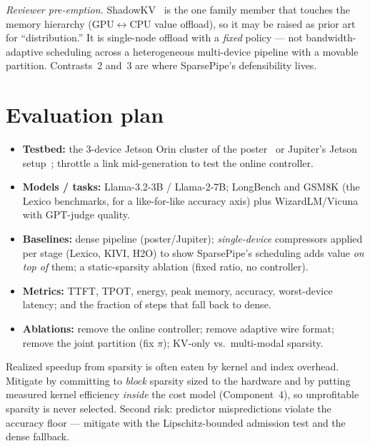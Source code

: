 \documentclass[11pt]{article}
\newcommand{\term}[1]{\textbf{\color{accent!85!black}#1}}
\begin{document}
\noindent\emph{Reviewer pre-emption.} ShadowKV~\cite{shadowkv} is the one family member that
touches the memory hierarchy (GPU$\leftrightarrow$CPU value offload), so it may be raised as
prior art for ``distribution.'' It is single-node offload with a \emph{fixed} policy --- not
bandwidth-adaptive scheduling across a heterogeneous multi-device pipeline with a movable
partition. Contrasts~2 and~3 are where SparsePipe's defensibility lives.

\section{Evaluation plan}

\begin{itemize}[leftmargin=1.5em,itemsep=2pt]
\item \term{Testbed:} the 3-device Jetson Orin cluster of the poster~\cite{poster} or
Jupiter's Jetson setup~\cite{jupiter}; throttle a link mid-generation to test the online
controller.
\item \term{Models / tasks:} Llama-3.2-3B / Llama-2-7B; LongBench and GSM8K (the Lexico
benchmarks, for a like-for-like accuracy axis) plus WizardLM/Vicuna with GPT-judge quality.
\item \term{Baselines:} dense pipeline (poster/Jupiter); \emph{single-device} compressors
applied per stage (Lexico, KIVI, H2O) to show SparsePipe's scheduling adds value \emph{on top
of} them; a static-sparsity ablation (fixed ratio, no controller).
\item \term{Metrics:} TTFT, TPOT, energy, peak memory, accuracy, worst-device latency; and
the fraction of steps that fall back to dense.
\item \term{Ablations:} remove the online controller; remove adaptive wire format; remove the
joint partition (fix $\pi$); KV-only vs.\ multi-modal sparsity.
\end{itemize}

\begin{riskbox}
Realized speedup from sparsity is often eaten by kernel and index overhead. Mitigate by
committing to \emph{block} sparsity sized to the hardware and by putting measured kernel
efficiency \emph{inside} the cost model (Component~4), so unprofitable sparsity is never
selected. Second risk: predictor mispredictions violate the accuracy floor --- mitigate with
the Lipschitz-bounded admission test and the dense fallback.
\end{riskbox}
\end{document}
